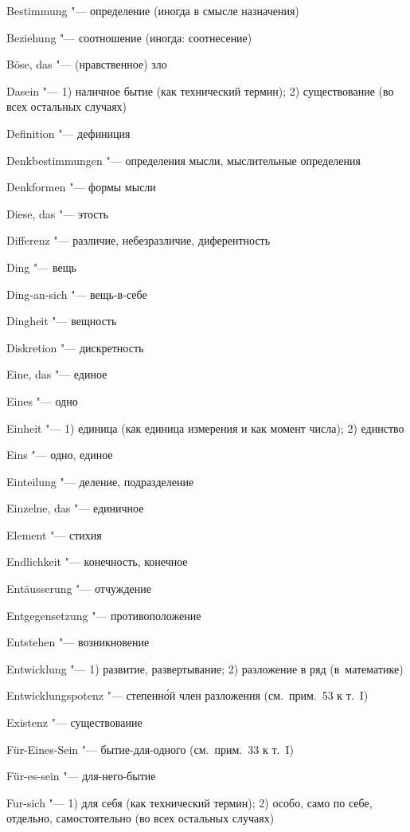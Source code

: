 \begin{multicols}{2}
Bestimmung "--- определение (иногда в смысле назначения)

Beziehung "--- соотношение (иногда: соотнесение)

Böse, das "--- (нравственное) зло

\bigskip

Dasein "--- 1) наличное бытие (как технический термин); 2)
существование (во всех остальных случаях)

Definition "--- дефиниция

Denk\-bestim\-mun\-gen "--- определения мысли, мыслительные определения

Denkformen "--- формы мысли

Diese, das "--- этость

Differenz "--- различие, небезразличие, диферентность

Ding "--- вещь

Ding-an-sich "--- вещь-в-себе

Dingheit "--- вещность

Diskretion "--- дискретность

\bigskip

Eine, das "--- единое

Eines "--- одно

Einheit "--- 1) единица (как единица измерения и как момент числа); 2) единство

Eins "--- одно, единое

Einteilung "--- деление, подразделение

Einzelne, das "--- единичное

Element "--- стихия

Endlichkeit "--- конечность, конечное

Entäus\-serung "--- отчуждение

Entgegen\-setzung "--- противоположение

Entstehen "--- возникновение

Entwicklung "--- 1) развитие, развертывание; 2) разложение в ряд (в~математике)

Ent\-wick\-lungs\-po\-tenz "--- степенн\'{о}й член разложения
(см.~прим.~53 к т.~I)

Existenz "--- существование

\bigskip

Für-Eines-Sein "--- бытие-для-одного (см.~прим.~33 к т.~I)

Für-es-sein "--- для-него-бытие

Fur-sich "--- 1) для себя (как технический термин); 2) особо,
само по себе, отдельно, самостоятельно (во всех остальных случаях)


\end{multicols}
